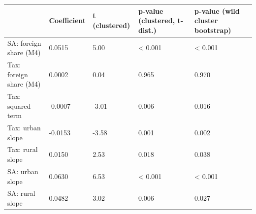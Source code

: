 \begin{tabular}{lllll}
\toprule
 & Coefficient & t (clustered) & p-value (clustered, t-dist.) & p-value (wild cluster bootstrap) \\
\midrule
SA: foreign share (M4) & 0.0515 & 5.00 & < 0.001 & < 0.001 \\
Tax: foreign share (M4) & 0.0002 & 0.04 & 0.965 & 0.970 \\
Tax: squared term & -0.0007 & -3.01 & 0.006 & 0.016 \\
Tax: urban slope & -0.0153 & -3.58 & 0.001 & 0.002 \\
Tax: rural slope & 0.0150 & 2.53 & 0.018 & 0.038 \\
SA: urban slope & 0.0630 & 6.53 & < 0.001 & < 0.001 \\
SA: rural slope & 0.0482 & 3.02 & 0.006 & 0.027 \\
\bottomrule
\end{tabular}
